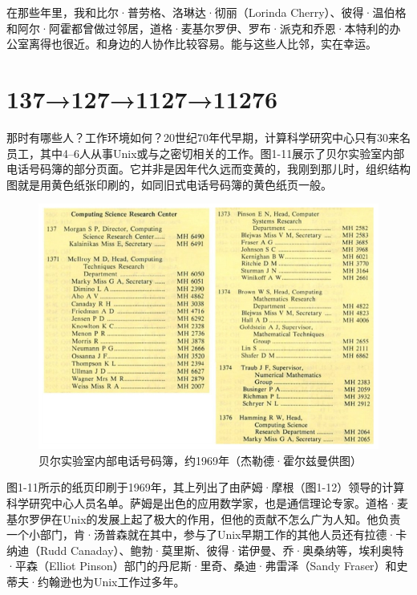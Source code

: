 \documentclass[a4paper,12pt,UTF8,twoside]{ctexbook}
\begin{document}
在那些年里，我和比尔·普劳格、洛琳达·彻丽（Lorinda Cherry）、彼得·温伯格和阿尔·阿霍都曾做过邻居，道格·麦基尔罗伊、罗布·派克和乔恩·本特利的办公室离得也很近。和身边的人协作比较容易。能与这些人比邻，实在幸运。

\section{137→127→1127→11276}

那时有哪些人？工作环境如何？20世纪70年代早期，计算科学研究中心只有30来名员工，其中4--6人从事Unix或与之密切相关的工作。图1-11展示了贝尔实验室内部电话号码簿的部分页面。它并非是因年代久远而变黄的，我刚到那儿时，组织结构图就是用黄色纸张印刷的，如同旧式电话号码簿的黄色纸页一般。

\begin{figure}[htbp]
	\centering
	\includegraphics[width=0.7\linewidth]{11}
	\caption{贝尔实验室内部电话号码簿，约1969年（杰勒德·霍尔兹曼供图）}
	\label{fig:1}
\end{figure}

图1-11所示的纸页印刷于1969年，其上列出了由萨姆·摩根（图1-12）领导的计算科学研究中心人员名单。萨姆是出色的应用数学家，也是通信理论专家。道格·麦基尔罗伊在Unix的发展上起了极大的作用，但他的贡献不怎么广为人知。他负责一个小部门，肯·汤普森就在其中，参与了Unix早期工作的其他人员还有拉德·卡纳迪（Rudd Canaday）、鲍勃·莫里斯、彼得·诺伊曼、乔·奥桑纳等，埃利奥特·平森（Elliot Pinson）部门的丹尼斯·里奇、桑迪·弗雷泽（Sandy Fraser）和史蒂夫·约翰逊也为Unix工作过多年。
\end{document}
